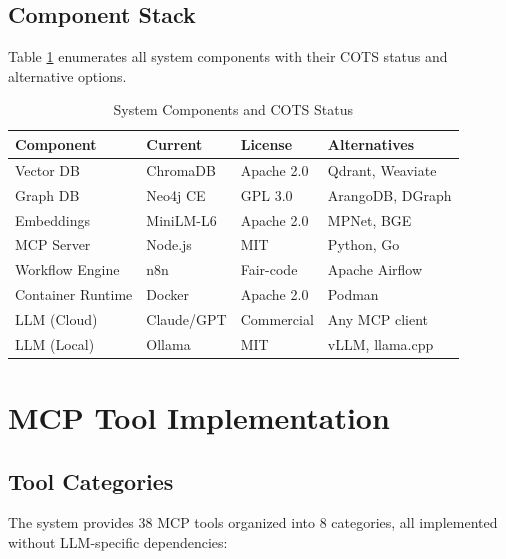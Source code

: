 \documentclass[11pt,twocolumn]{article}
\begin{document}
\subsection{Component Stack}

Table \ref{tab:components} enumerates all system components with their COTS status and alternative options.

\begin{table}[h]
\centering
\caption{System Components and COTS Status}
\label{tab:components}
\scriptsize
\begin{tabular}{@{}llll@{}}
\toprule
\textbf{Component} & \textbf{Current} & \textbf{License} & \textbf{Alternatives} \\
\midrule
Vector DB & ChromaDB & Apache 2.0 & Qdrant, Weaviate \\
Graph DB & Neo4j CE & GPL 3.0 & ArangoDB, DGraph \\
Embeddings & MiniLM-L6 & Apache 2.0 & MPNet, BGE \\
MCP Server & Node.js & MIT & Python, Go \\
Workflow Engine & n8n & Fair-code & Apache Airflow \\
Container Runtime & Docker & Apache 2.0 & Podman \\
LLM (Cloud) & Claude/GPT & Commercial & Any MCP client \\
LLM (Local) & Ollama & MIT & vLLM, llama.cpp \\
\bottomrule
\end{tabular}
\end{table}

\section{MCP Tool Implementation}

\subsection{Tool Categories}

The system provides 38 MCP tools organized into 8 categories, all implemented without LLM-specific dependencies:
\end{document}
